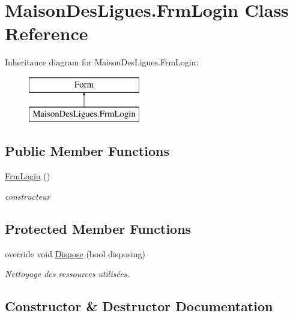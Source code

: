 \hypertarget{class_maison_des_ligues_1_1_frm_login}{}\section{Maison\+Des\+Ligues.\+Frm\+Login Class Reference}
\label{class_maison_des_ligues_1_1_frm_login}
Inheritance diagram for Maison\+Des\+Ligues.\+Frm\+Login\+:\begin{figure}[H]
\begin{center}
\leavevmode
\includegraphics[height=2.000000cm]{class_maison_des_ligues_1_1_frm_login}
\end{center}
\end{figure}
\subsection*{Public Member Functions}
\begin{DoxyCompactItemize}
\item 
\hyperlink{class_maison_des_ligues_1_1_frm_login_a16d5a2efd1c29334f1a0ccf25c910b64}{Frm\+Login} ()
\begin{DoxyCompactList}\small\item\em constructeur \end{DoxyCompactList}\end{DoxyCompactItemize}
\subsection*{Protected Member Functions}
\begin{DoxyCompactItemize}
\item 
override void \hyperlink{class_maison_des_ligues_1_1_frm_login_a1b5a9829dc7217d8cca6c504b59cc9c6}{Dispose} (bool disposing)
\begin{DoxyCompactList}\small\item\em Nettoyage des ressources utilisées. \end{DoxyCompactList}\end{DoxyCompactItemize}


\subsection{Constructor \& Destructor Documentation}
\hypertarget{class_maison_des_ligues_1_1_frm_login_a16d5a2efd1c29334f1a0ccf25c910b64}{}
